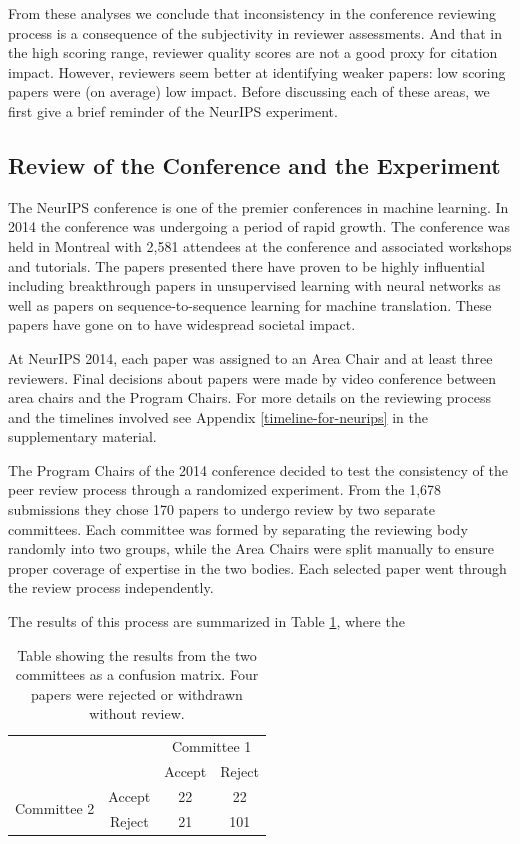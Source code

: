 \documentclass[twoside]{article}
\begin{document}
From these analyses we conclude that inconsistency in the conference
reviewing process is a consequence of the subjectivity in reviewer
assessments. And that in the high scoring range, reviewer quality scores
are not a good proxy for citation impact. However, reviewers seem better
at identifying weaker papers: low scoring papers were (on average) low
impact. Before discussing each of these areas, we first give a brief
reminder of the NeurIPS experiment.

\hypertarget{review-of-the-conference-and-the-experiment}{%
\subsection{Review of the Conference and the
Experiment}\label{review-of-the-conference-and-the-experiment}}

The NeurIPS conference is one of the premier conferences in machine
learning. In 2014 the conference was undergoing a period of rapid
growth. The conference was held in Montreal with 2,581 attendees at the
conference and associated workshops and tutorials. The papers presented
there have proven to be highly influential including breakthrough papers
in unsupervised learning with neural networks as well as papers on
sequence-to-sequence learning for machine translation. These papers have
gone on to have widespread societal impact.

At NeurIPS 2014, each paper was assigned to an Area Chair and at least
three reviewers. Final decisions about papers were made by video
conference between area chairs and the Program Chairs. For more details
on the reviewing process and the timelines involved see Appendix \ref{timeline-for-neurips} in
the supplementary material.

The Program Chairs of the 2014 conference decided to test the
consistency of the peer review process through a randomized experiment.
From the 1,678 submissions they chose 170 papers to undergo review by
two separate committees. Each committee was formed by separating the
reviewing body randomly into two groups, while the Area Chairs were
split manually to ensure proper coverage of expertise in the two bodies.
Each selected paper went through the review process independently.

The results of this process are summarized in Table \ref{table-neurips-experiment-results}, where the
\begin{table}[htb]
\caption{Table showing the results from the two committees as a confusion matrix. Four papers were rejected or withdrawn without review.}
\label{table-neurips-experiment-results}

\begin{tabular}{lc|c|c|}
& & \multicolumn{2}{c}{Committee 1} \\
& & Accept & Reject \\ \hline
\multirow{2}{*}{Committee 2} & Accept & 22 & 22 \\
& Reject & 21 & 101 
\end{tabular}
\end{table}
\end{document}
